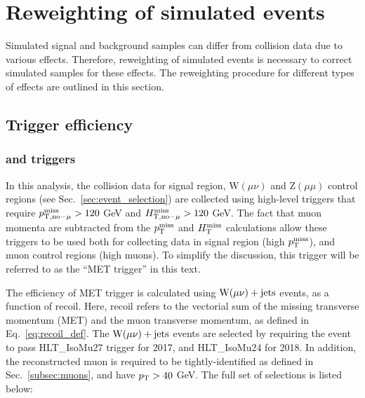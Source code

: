 \section{Reweighting of simulated events} \label{sec:reweighting}

\graphicspath{{3_DataAnalysisStrategy/Figures}}

Simulated signal and background samples can differ from collision data due to
various effects. Therefore, reweighting of simulated events is necessary to correct
simulated samples for these effects. The reweighting procedure for different types of 
effects are outlined in this section.

\subsection{Trigger efficiency}
\label{subsec:trigger_eff_reweighting}

\subsubsection{\ptmissnomu and \htmissnomu triggers}
\label{subsubsec:met_trigger_eff}

In this analysis, the collision data for signal region, $\textrm{W}(\mu \nu)$ and $\textrm{Z}(\mu \mu)$ 
control regions (see Sec.~\ref{sec:event_selection}) are collected using high-level triggers 
that require $p_{\textrm{T},\textrm{no}-\mu}^{\textrm{miss}} > 120$ GeV
and $H_{\textrm{T},\textrm{no}-\mu}^{\textrm{miss}} > 120$ GeV. The fact that muon momenta are subtracted
from the $p_{\textrm{T}}^{\textrm{miss}}$ and $H_{\mathrm{T}}^{\mathrm{miss}}$ calculations allow these triggers to be used both for collecting data in
signal region (high $p_{\textrm{T}}^{\textrm{miss}}$), and muon control regions (high \pt muons).
To simplify the discussion, this trigger will be referred to as the ``MET trigger'' in this text.

The efficiency of MET trigger is calculated using $\textrm{W}(\mu\nu)+\textrm{jets}$ events, as a function of recoil.
Here, recoil refers to the vectorial sum of the missing transverse momentum (MET) and the muon transverse momentum,
as defined in Eq.~\ref{eq:recoil_def}. The $\textrm{W}(\mu\nu)+\textrm{jets}$ events are selected by requiring 
the event to pass HLT\_IsoMu27 trigger for 2017, and HLT\_IsoMu24
for 2018. In addition, the reconstructed muon is required to be tightly-identified as defined in Sec.~\ref{subsec:muons}, 
and have $p_{\textrm{T}} > 40$ GeV. The full set of selections is listed below:

